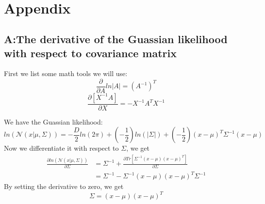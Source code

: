 \documentclass[11pt]{article}
\begin{document}
\section{Appendix}
\subsection{A:The derivative of the Guassian likelihood with respect to covariance matrix}
First we list some math tools we will use:
\begin{equation}
\frac{\partial}{\partial A}ln|A|=(A^{-1})^T 
\end{equation}
\begin{equation}
\frac{\partial[X^{-1}A]}{\partial X}=-X^{-1}A^TX^{-1}
\end{equation}

We have the Guassian likelihood:
\begin{equation}
ln(\mathcal{N}(x|\mu, \Sigma))=-\frac{D}{2}ln(2\pi) + (-\frac{1}{2})ln(|\Sigma|) + (-\frac{1}{2})(x-\mu)^T\Sigma^{-1}(x-\mu)
\end{equation}
Now we differentiate it with respect to $\Sigma$, we get
\begin{equation}
\begin{split}
\frac{\partial ln(\mathcal{N}(x|\mu, \Sigma))}{\partial \Sigma}&= {\Sigma}^{-1} + \frac{\partial Tr[\Sigma^{-1}(x-\mu)(x-\mu)^T]}{\partial \Sigma} \\
&= {\Sigma}^{-1} -\Sigma^{-1}(x-\mu)(x-\mu)^T\Sigma^{-1}
\end{split}
\end{equation}
By setting the derivative to zero, we get 
\begin{equation}
\Sigma=(x-\mu)(x-\mu)^T
\end{equation}


\end{document}

